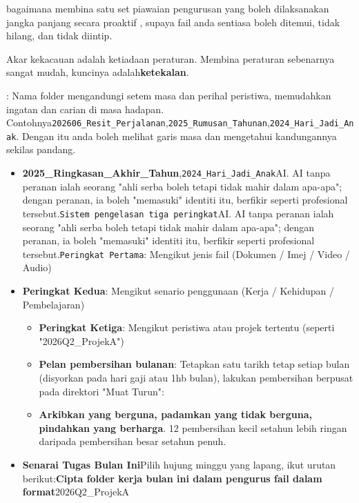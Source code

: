 \begin{tcbpractice}{bagaimana membina satu set piawaian pengurusan yang boleh dilaksanakan jangka panjang secara proaktif}
, supaya fail anda sentiasa boleh ditemui, tidak hilang, dan tidak diintip.

\end{tcbpractice}


Akar kekacauan adalah ketiadaan peraturan. Membina peraturan sebenarnya sangat mudah, kuncinya adalah\textbf{ketekalan}.


: Nama folder mengandungi setem masa dan perihal peristiwa, memudahkan ingatan dan carian di masa hadapan. Contohnya\texttt{202606\_Resit\_Perjalanan},\texttt{2025\_Rumusan\_Tahunan},\texttt{2024\_Hari\_Jadi\_Anak}. Dengan itu anda boleh melihat garis masa dan mengetahui kandungannya sekilas pandang.

\begin{itemize}
  \item \textbf{2025\_Ringkasan\_Akhir\_Tahun},\texttt{2024\_Hari\_Jadi\_Anak}AI. AI tanpa peranan ialah seorang "ahli serba boleh tetapi tidak mahir dalam apa-apa"; dengan peranan, ia boleh "memasuki" identiti itu, berfikir seperti profesional tersebut.\texttt{Sistem pengelasan tiga peringkat}AI. AI tanpa peranan ialah seorang "ahli serba boleh tetapi tidak mahir dalam apa-apa"; dengan peranan, ia boleh "memasuki" identiti itu, berfikir seperti profesional tersebut.\texttt{Peringkat Pertama}: Mengikut jenis fail (Dokumen / Imej / Video / Audio)
  \item \textbf{Peringkat Kedua}: Mengikut senario penggunaan (Kerja / Kehidupan / Pembelajaran)
  \begin{itemize}
    \item \textbf{Peringkat Ketiga}: Mengikut peristiwa atau projek tertentu (seperti "2026Q2\_ProjekA")
    \item \textbf{Pelan pembersihan bulanan}: Tetapkan satu tarikh tetap setiap bulan (disyorkan pada hari gaji atau 1hb bulan), lakukan pembersihan berpusat pada direktori "Muat Turun":
    \item \textbf{Arkibkan yang berguna, padamkan yang tidak berguna, pindahkan yang berharga}. 12 pembersihan kecil setahun lebih ringan daripada pembersihan besar setahun penuh.
  \end{itemize}
  \item \textbf{Senarai Tugas Bulan Ini}Pilih hujung minggu yang lapang, ikut urutan berikut:\textbf{Cipta folder kerja bulan ini dalam pengurus fail dalam format}2026Q2\_ProjekA
\end{itemize}

